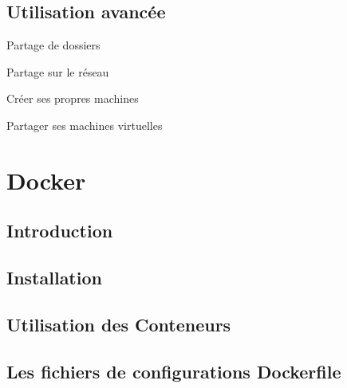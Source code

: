 \documentclass{beamer}
\begin{document}
    \subsection{Utilisation avancée}
    \begin{frame}{Partage de dossiers}
    \end{frame}

    \begin{frame}{Partage sur le réseau}
    \end{frame}

    \begin{frame}{Créer ses propres machines}
    \end{frame}

    \begin{frame}{Partager ses machines virtuelles}
    \end{frame}

    
    \section{Docker}
    \subsection{Introduction}
    \begin{frame}
    \end{frame}

    \subsection{Installation}
    \begin{frame}
    \end{frame}

    \subsection{Utilisation des Conteneurs}
    \begin{frame}
    \end{frame}

    \subsection{Les fichiers de configurations Dockerfile}
    \begin{frame}
    \end{frame}
\end{document}
